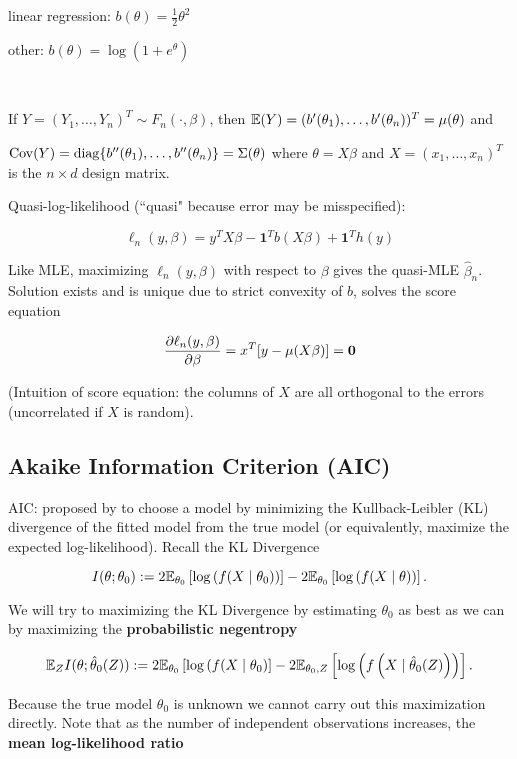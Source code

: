 linear regression: \(b(\theta) = \frac{1}{2} \theta^2\)

other: \(b(\theta) = \log(1 + e^{\theta})\)

\

If \(Y = (Y_1, \ldots, Y_n)^T \sim F_n(\cdot, \beta)\), then \(\mathbb{E}(Y) = (b'(\theta_1), \ldots, b'(\theta_n))^T = \mu(\theta)\) and 

\(\mathrm{Cov}(Y) = \operatorname{diag}\{b''(\theta_1), \ldots, b''(\theta_n)\} = \Sigma(\theta)\) where \(\theta = X \beta\) and \(X = (x_1, \ldots ,x_n)^T\) is the \(n \times d\) design matrix.

Quasi-log-likelihood (``quasi" because error may be misspecified):

\[
\ell_n(y, \beta) = y^T X \beta - \boldsymbol{1}^Tb(X \beta) + \boldsymbol{1}^T h(y)
\]

Like MLE, maximizing \(\ell_n(y, \beta)\) with respect to \(\beta\) gives the quasi-MLE \(\hat{\beta}_n\). Solution exists and is unique due to strict convexity of \(b\), solves the score equation

\[
\frac{\partial \ell_n(y,\beta)}{\partial \beta} = x^T[y - \mu(X \beta)] = \boldsymbol{0}
\]

(Intuition of score equation: the columns of \(X\) are all orthogonal to the errors (uncorrelated if \(X\) is random).


\subsection{Akaike Information Criterion (AIC)}\label{linreg.aic.bic}

AIC: proposed by \citet{Akaike1973} to choose a model by minimizing the Kullback-Leibler (KL) divergence of the fitted model from the true model (or equivalently, maximize the expected log-likelihood). Recall the KL Divergence

\[
I(\theta; \theta_0) := 2\mathbb{E}_{\theta_0} \left[ \log \left( f(X \mid \theta_0) \right) \right] - 2 \mathbb{E}_{\theta_0} \left[ \log \left( f(X \mid \theta) \right) \right].
\]

We will try to maximizing the KL Divergence by estimating \(\theta_0\) as best as we can by maximizing the \textbf{probabilistic negentropy}

 \[
\mathbb{E}_Z I(\theta; \hat{\theta}_0(Z)) := 2\mathbb{E}_{\theta_0} \left[ \log \left( f(X \mid \theta_0 \right) \right] - 2 \mathbb{E}_{\theta_0, Z} \left[ \log \left( f \left(X \mid \hat{\theta}_0(Z) \right) \right) \right].
\]

Because the true model \(\theta_0\) is unknown we cannot carry out this maximization directly. Note that as the number of independent observations increases, the \textbf{mean log-likelihood ratio}

